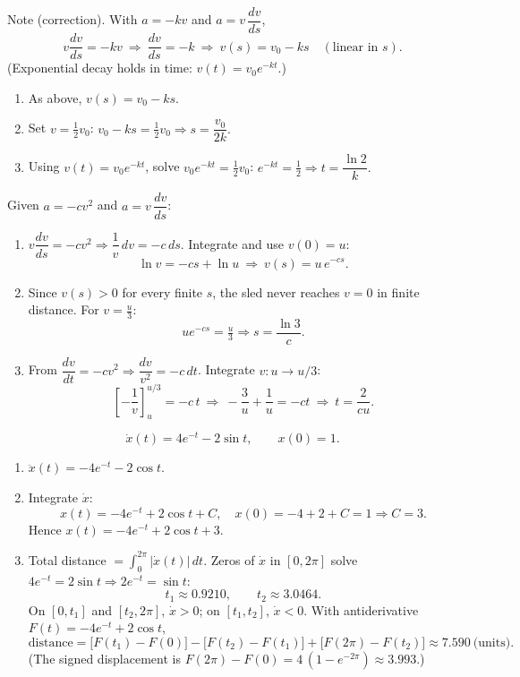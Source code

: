 \documentclass[11pt]{article}
\def\textit#1{#1}%
\begin{document}
\begin{solution}
\textit{Note (correction).} With \(a=-kv\) and \(a=v\,\dfrac{dv}{ds}\),
\[
v\frac{dv}{ds}=-kv \ \Rightarrow\ \frac{dv}{ds}=-k
\ \Rightarrow\ \boxed{v(s)=v_0-ks}\quad(\text{linear in }s).
\]
(Exponential decay holds in time: \( \displaystyle v(t)=v_0e^{-kt}\).)
\begin{enumerate}
\item As above, \(v(s)=v_0-ks\).
\item Set \(v=\tfrac{1}{2}v_0\): \(v_0-ks=\tfrac{1}{2}v_0\Rightarrow
\boxed{s=\dfrac{v_0}{2k}}.\)
\item Using \(v(t)=v_0e^{-kt}\), solve \(v_0e^{-kt}=\tfrac12 v_0\):
\(e^{-kt}=\tfrac12\Rightarrow \boxed{t=\dfrac{\ln 2}{k}}.\)
\end{enumerate}
\end{solution}

\begin{solution}
Given \(a=-cv^{2}\) and \(a=v\,\dfrac{dv}{ds}\):
\begin{enumerate}
\item \(v\dfrac{dv}{ds}=-cv^{2}\Rightarrow \dfrac{1}{v}\,dv=-c\,ds\).
Integrate and use \(v(0)=u\):
\[
\ln v = -cs+\ln u\ \Rightarrow\ \boxed{v(s)=u\,e^{-cs}}.
\]
\item Since \(v(s)>0\) for every finite \(s\), the sled never reaches \(v=0\) in
finite distance. For \(v=\tfrac{u}{3}\):
\[
u e^{-cs}=\tfrac{u}{3}\Rightarrow s=\boxed{\dfrac{\ln 3}{c}}.
\]
\item From \( \dfrac{dv}{dt}=-cv^{2}\Rightarrow \dfrac{dv}{v^{2}}=-c\,dt\).
Integrate \(v:u\to u/3\):
\[
\left[-\frac{1}{v}\right]_{u}^{u/3}=-c\,t \ \Rightarrow\ 
-\frac{3}{u}+\frac{1}{u}=-ct \ \Rightarrow\ 
\boxed{t=\dfrac{2}{cu}}.
\]
\end{enumerate}
\end{solution}

\begin{solution}
\[
\dot{x}(t)=4e^{-t}-2\sin t,\qquad x(0)=1.
\]
\begin{enumerate}
\item \(\ddot{x}(t)=-4e^{-t}-2\cos t\).
\item Integrate \(\dot{x}\):
\[
x(t)=-4e^{-t}+2\cos t+C,\quad 
x(0)=-4+2+C=1\Rightarrow C=3.
\]
Hence \(\boxed{x(t)=-4e^{-t}+2\cos t+3}\).
\item Total distance \(=\int_{0}^{2\pi}\!|\dot{x}(t)|\,dt\).
Zeros of \(\dot{x}\) in \([0,2\pi]\) solve \(4e^{-t}=2\sin t\Rightarrow 2e^{-t}=\sin t\):
\[
t_1\approx0.9210,\qquad t_2\approx3.0464.
\]
On \([0,t_1]\) and \([t_2,2\pi]\), \(\dot{x}>0\); on \([t_1,t_2]\), \(\dot{x}<0\).
With antiderivative \(F(t)=-4e^{-t}+2\cos t\),
\[
\text{distance}= \big[F(t_1)-F(0)\big] - \big[F(t_2)-F(t_1)\big] + \big[F(2\pi)-F(t_2)\big]
\approx \boxed{7.590\ \text{(units)}}.
\]
(The signed displacement is \(F(2\pi)-F(0)=4\,(1-e^{-2\pi})\approx3.993\).)
\end{enumerate}
\end{solution}
\end{document}
